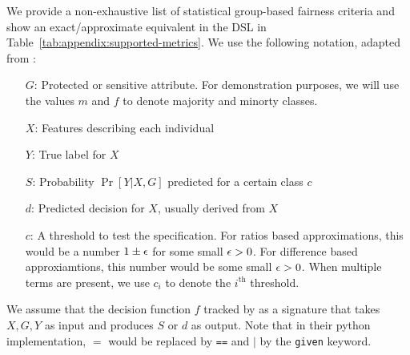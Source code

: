 \begin{table}[ht]
    \centering
    \resizebox{\linewidth}{!}{
    \begin{tabular}{lcc}
    \toprule
        Metric Name  & Definition & DSL  \\
    \midrule \\
       Statistical Parity  & \multirow{2}{*}{$\Pr[d=1|G=m] = \Pr[d=1|G=f]$}  & \multirow{2}{*}{$\E[d|G=m] / \E[d|G=f] < c$} \\
       \citep{dwork2012fairness} & &\\
       Predictive Parity & \multirow{2}{*}{$\Pr[Y=1|d=1, G=m] = \Pr[Y=1|d=1, G=f]$} & \multirow{2}{*}{$E[Y=1|d=1, G=f] - \E[Y=1|d=1, G=m] > c$} \\
       \citep{chouldechova2017fair} & & \\
       Equal Opportunity &\multirow{2}{*}{$\Pr[d=0|Y=1, G=m] = \Pr[d=0|Y=1, G=f]$}  & \multirow{2}{*}{$\E[d=0|Y=1, G=m] - \E[d=0|Y=1, G=f] < c$} \\
       \citep{hardt2016equality} & &  \\
       Equalized Odds & $\Pr[d=1|Y=i, G=m] = \Pr[d=1]Y=i, G=f],$ & $(\E[d=1|Y=1, G=f] - \E[d=1|Y=1, G=m] > c_1) \&  $ \\
       \citep{hardt2016equality} & $i = 0, 1$ & $(\E[d=1|Y=0, G=f] - \E[d=1|Y=0, G=m] > c_2)$\\
    \bottomrule
    \end{tabular}
    }
    \caption{Examples of supported metrics.}
    \label{tab:appendix:supported-metrics}
\end{table}

We provide a non-exhaustive list of statistical group-based fairness criteria and show an exact/approximate equivalent in the \AVOIRmethodname{} DSL in Table~\ref{tab:appendix:supported-metrics}.
We use the following notation, adapted from \citet{verma2018fairness}:
\begin{itemize}
    \item[$G$:] Protected or sensitive attribute. For demonstration purposes, we will use the values $m$ and $f$ to denote majority and minorty classes.
    \item[$X$:] Features describing each individual 
    \item[$Y$:] True label for $X$
    \item[$S$:] Probability $\Pr[Y|X, G]$ predicted for a certain class $c$
    \item[$d$:] Predicted decision for $X$, usually derived from $X$
    \item[$c$:] A threshold to test the specification. For ratios based approximations, this would be a number $1 \pm {\epsilon}$ for some small ${\epsilon} > 0$. For difference based approxiamtions, this number would be some small ${\epsilon} > 0$. When multiple terms are present, we use $c_i$ to denote the $i^{\text{th}}$ threshold.
\end{itemize}
We assume that the decision function $f$ tracked by \AVOIRmethodname{} as a signature that takes $X, G, Y$ as input and produces $S$ or $d$ as output.
Note that in their python implementation, $=$ would be replaced by \lstinline{==} and $|$ by the \lstinline{given} keyword.
